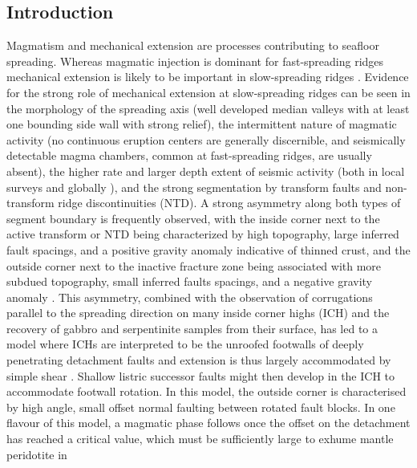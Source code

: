 \documentclass[jgr]{agu2001}
\newlength{\tw}
\providecommand{\DIFadd}[1]{{\protect\color{blue}\uwave{#1}}} %
\providecommand{\DIFaddbegin}{} %
\providecommand{\DIFaddend}{} %
\begin{document}
\begin{article}

\section{Introduction}

Magmatism and mechanical extension are 
 processes contributing to  seafloor spreading.  Whereas magmatic injection is dominant for
fast-spreading ridges mechanical extension is likely to be important
in slow-spreading ridges  \citep{mutter92}.  Evidence for the strong
role of mechanical extension at slow-spreading ridges can be seen in the morphology of the
spreading axis (well developed median valleys with at least one
bounding side wall with strong relief), the intermittent nature of
magmatic activity (no continuous eruption centers are generally 
discernible, and seismically detectable magma chambers, common at
fast-spreading ridges, are usually absent), the higher rate and larger
depth extent of seismic activity (both in local surveys
\citep[e.g.,][]{toomey88} and globally \citep{huang88,rundquist02}),
and the strong segmentation by transform faults and non-transform
ridge discontinuities (NTD). A strong asymmetry along both types of
segment boundary is frequently observed, with the inside corner next
to the active transform or NTD being
characterized  by high topography, large inferred fault spacings, and a positive gravity anomaly
indicative of thinned crust, and the outside corner next to the
inactive fracture zone being associated with more subdued topography,
small inferred faults spacings, 
and a negative gravity anomaly \citep{shaw93,escartin95}. This asymmetry,
combined with the observation of corrugations parallel to the
spreading direction on many inside corner highs (ICH) and the
recovery of gabbro and serpentinite samples from their surface, has
led to a model where ICHs are interpreted to be the unroofed footwalls
of  deeply penetrating detachment faults and  extension
is thus largely accommodated by simple shear
\citep{tucholke94}. Shallow listric successor faults might then
develop in the ICH to accommodate \DIFaddbegin \DIFadd{bending as result of progressive }\DIFaddend footwall rotation.  In this model, the outside
corner is characterised by high angle, small offset normal faulting
between rotated fault blocks. In one flavour of this model, a magmatic
phase follows once the offset on the detachment has reached a critical
value, which must be sufficiently large to exhume mantle peridotite in

\end{article}
\end{document}
